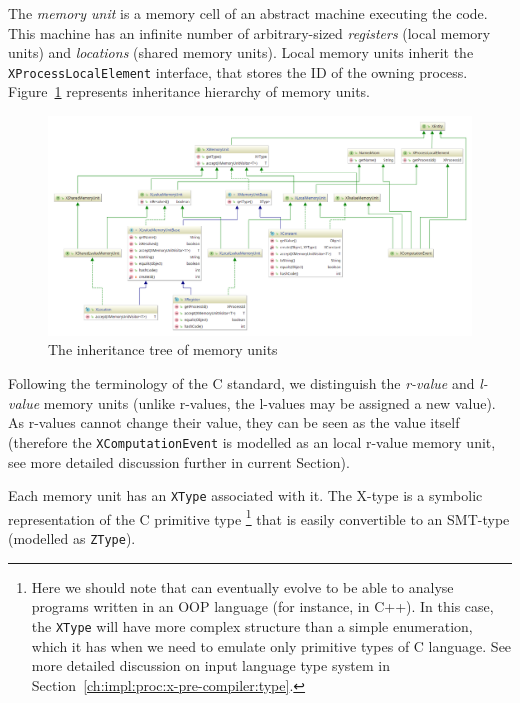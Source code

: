The \textit{memory unit} is a memory cell of an abstract machine executing the code.
This machine has an infinite number of arbitrary-sized \textit{registers} (local memory units) and \textit{locations} (shared memory units).
Local memory units inherit the \texttt{XProcessLocalElement} interface, that stores the ID of the owning process.
Figure~\ref{fig:class-diagrams:XMemoryUnit} represents inheritance hierarchy of memory units.

\begin{figure}[t]%
  \centering
  \includegraphics[width=\textwidth,height=\textheight,keepaspectratio]{img/my/class-diagrams/XMemoryUnit-m.png}
  \caption{The inheritance tree of \xgraph{} memory units}
  \label{fig:class-diagrams:XMemoryUnit}
\end{figure}

Following the terminology of the C standard, we distinguish the \textit{r-value} and \textit{l-value} memory units (unlike r-values, the l-values may be assigned a new value).
As r-values cannot change their value, they can be seen as the value itself (therefore the \texttt{XComputationEvent} is modelled as an local r-value memory unit, see more detailed discussion further in current Section).

Each memory unit has an \texttt{XType} associated with it.
The X-type is a symbolic representation of the C primitive type%
%
\footnote{Here we should note that \porthos[2] can eventually evolve to be able to analyse programs written in an OOP language (for instance, in C++). In this case, the \texttt{XType} will have more complex structure than a simple enumeration, which it has when we need to emulate only primitive types of C language. See more detailed discussion on input language type system in Section~\ref{ch:impl:proc:x-pre-compiler:type}.} %
%
that is easily convertible to an SMT-type (modelled as \texttt{ZType}).%

